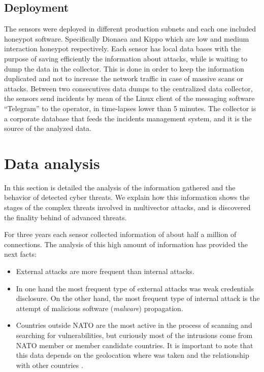 \documentclass[a4paper]{llncs}
\begin{document}
\subsection{Deployment}
The sensors were deployed in different production subnets and each one included honeypot software. Specifically Dionaea\cite{dionaea} and Kippo\cite{kippo} which are low and medium interaction honeypot respectively. Each sensor has local data bases with the purpose of saving efficiently the information about attacks, while is waiting to dump the data in the collector. This is done in order to keep the information duplicated and not to increase the network traffic in case of massive scans or attacks. Between two consecutives data dumps to the centralized data collector, the sensors send incidents by mean of the Linux client of the messaging software ``Telegram''\cite{telegram-messenger} to the operator, in time-lapses lower than 5 minutes. The collector is a corporate database that feeds the incidents management system, and it is the source of the analyzed data.

\section{Data analysis}
\label{sec:analysis}
In this section is detailed the analysis of the information gathered and the behavior of detected cyber threats. We explain how this information shows the stages of the complex threats involved in multivector attacks, and is discovered the finality behind of advanced threats.

For three years each sensor collected information of about half a million of connections. The analysis of this high amount of information has provided the next facts:
\begin{itemize}
	\item External attacks are more frequent than internal attacks.
	\item In one hand the most frequent type of external attacks was weak credentials disclosure. On the other hand, the most frequent type of internal attack is the attempt of malicious software ({\it malware}) propagation.
	\item Countries outside NATO are the most active in the process of scanning and searching for vulnerabilities, but curiously most of the intrusions come from NATO member or member candidate countries. It is important to note that this data depends on the geolocation where was taken and the relationship with other countries \cite{wiki-cyberwarfare-china,wiki-cyberwarfare-eeuu}.
\end{itemize}
\end{document}
